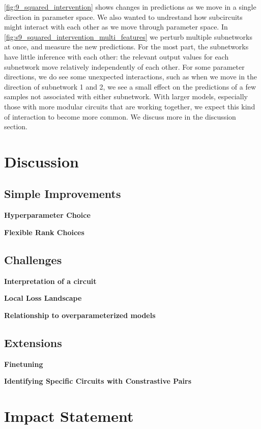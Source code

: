 \documentclass{article}
\theoremstyle{plain}
\theoremstyle{definition}
\theoremstyle{remark}
\begin{document}
\ref{fig:9_squared_intervention} shows changes in predictions as we move in a single direction in parameter space. We also wanted to undrestand how subcircuits might interact with each other as we move through parameter space. In \ref{fig:s9_squared_intervention_multi_features} we perturb multiple subnetworks at once, and measure the new predictions. For the most part, the subnetworks have little inference with each other: the relevant output values for each subnetwork move relatively independently of each other. For some parameter directions, we do see some unexpected interactions, such as when we move in the direction of subnetwork 1 and 2, we see a small effect on the predictions of a few samples not associated with either subnetwork. With larger models, especially those with more modular circuits that are working together, we expect this kind of interaction to become more common. We discuss more in the discussion section. 

\section{Discussion}

\subsection{Simple Improvements}

\textbf{Hyperparameter Choice}

\textbf{Flexible Rank Choices}

\subsection{Challenges}

\textbf{Interpretation of a circuit}

\textbf{Local Loss Landscape}

\textbf{Relationship to overparameterized models}

\subsection{Extensions}

\textbf{Finetuning}

\textbf{Identifying Specific Circuits with Constrastive Pairs}


\clearpage

\section{Impact Statement}
\end{document}
